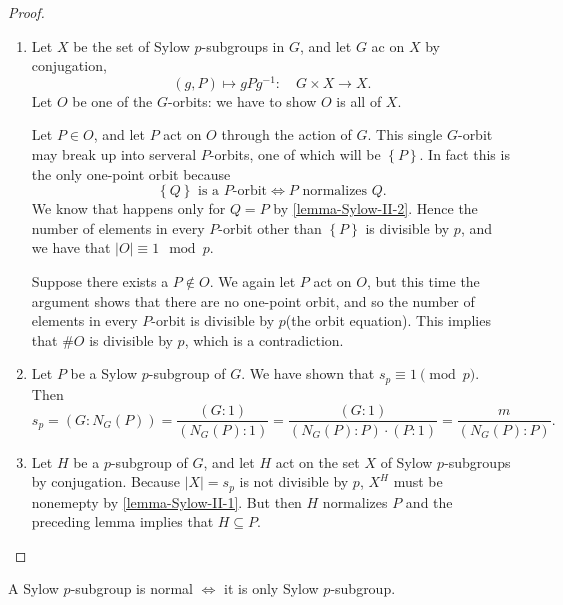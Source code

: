 \begin{proof}
  \begin{enumerate}
    \item Let \( X \) be the set of Sylow \( p \)-subgroups in \( G \), and let \( G \) ac on \( X \) by conjugation,
      \[
        (g, P) \mapsto g P g^{-1}: \quad G \times X \to X.
      \]
      Let \( O \) be one of the \( G \)-orbits: we have to show \( O \) is all of \( X \).

      Let \( P \in O \), and let \( P \) act on \( O \) through the action of \( G \).
      This single \( G \)-orbit may break up into serveral \( P \)-orbits, one of which will be \( \left\lbrace P \right\rbrace \).
      In fact this is the only one-point orbit because
      \[
        \left\lbrace Q \right\rbrace \text{ is a } P \text{-orbit} \iff P \text{ normalizes } Q.
      \]
      We know that happens only for \( Q = P \) by \ref{lemma-Sylow-II-2}.
      Hence the number of elements in every \( P \)-orbit other than \( \left\lbrace P \right\rbrace \) is divisible by \( p \), and we have that \( \left\vert O \right\vert \equiv 1 \mod{p} \).

      Suppose there exists a \( P \notin O \).
      We again let \( P \) act on \( O \), but this time the argument shows that there are no one-point orbit, and so the number of elements in every \( P \)-orbit is divisible by \( p \)(the orbit equation).
      This implies that \( \# O \) is divisible by \( p \), which is a contradiction.
    \item Let \( P \) be a Sylow \( p \)-subgroup of \( G \).
      We have shown that \( s_p \equiv 1 \pmod{p} \).
      Then
      \[
        s_p = (G : N_G(P)) = \frac{(G : 1)}{(N_G(P) : 1)} = \frac{(G : 1)}{(N_G(P): P) \cdot (P : 1)} = \frac{m}{(N_G(P): P)}.
      \]
    \item Let \( H \) be a \( p \)-subgroup of \( G \), and let \( H \) act on the set \( X \) of Sylow \( p \)-subgroups by conjugation.
      Because \( \left\vert X \right\vert = s_p \) is not divisible by \( p \), \( X^H \) must be nonemepty by \ref{lemma-Sylow-II-1}.
      But then \( H \) normalizes \( P \) and the preceding lemma implies that \( H \subseteq P \).
  \end{enumerate}
\end{proof}

\begin{corollary}
  \label{corollary-Sylow-p-subgroup-normal}
  A Sylow \( p \)-subgroup is normal \( \iff \) it is only Sylow \( p \)-subgroup.
\end{corollary}

